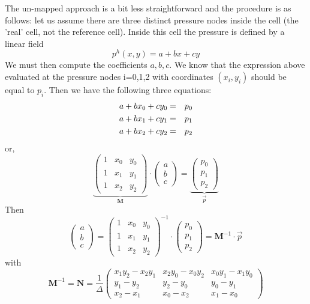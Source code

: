 The un-mapped approach is a bit less straightforward and the procedure is as follows:
let us assume there are three distinct pressure nodes inside the cell (the 'real'
cell, not the reference cell).
Inside this cell the pressure is defined by a linear field
\[
p^h(x,y) = a+bx+cy
\]
We must then compute the coefficients $a,b,c$. We know that 
the expression above evaluated at the pressure nodes i=0,1,2 with 
coordinates $(x_i,y_i)$ should be equal to $p_i$. 
Then we have the following three equations:
\begin{eqnarray}
a + bx_0 + cy_0 &=& p_0 \nonumber\\
a + bx_1 + cy_1 &=& p_1 \nonumber\\
a + bx_2 + cy_2 &=& p_2 \nonumber
\end{eqnarray}
or, 
\[
\underbrace{
\left(
\begin{array}{ccc}
1 & x_0 & y_0 \\
1 & x_1 & y_1 \\
1 & x_2 & y_2 
\end{array}
\right)
}_{{\bm M}}
\cdot 
\left(
\begin{array}{ccc}
a \\ b \\ c
\end{array}
\right)
=
\underbrace{
\left(
\begin{array}{ccc}
p_0 \\ p_1 \\ p_2
\end{array}
\right)
}_{\vec{p}}
\]
Then 
\[
\left(
\begin{array}{ccc}
a \\ b \\ c
\end{array}
\right)
=
\left(
\begin{array}{ccc}
1 & x_0 & y_0 \\
1 & x_1 & y_1 \\
1 & x_2 & y_2 
\end{array}
\right)^{-1}
\cdot
\left(
\begin{array}{ccc}
p_0 \\ p_1 \\ p_2
\end{array}
\right)
= {\bm M}^{-1} \cdot \vec{p}
\]
with 
\[
{\bm M}^{-1} 
= {\bm N} 
= \frac{1}{\Delta}
\left(
\begin{array}{ccc}
x_1y_2-x_2y_1 & x_2y_0-x_0y_2 & x_0y_1-x_1y_0 \\
y_1-y_2 & y_2-y_0 & y_0-y_1 \\
x_2-x_1 & x_0-x_2 & x_1-x_0
\end{array}
\right)
\]
